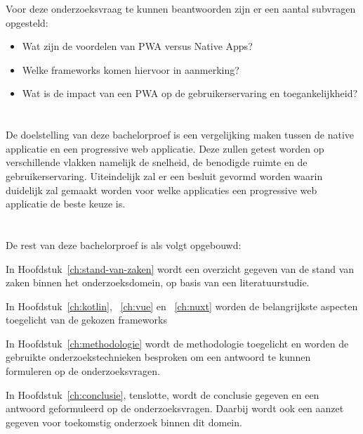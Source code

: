 Voor deze onderzoeksvraag te kunnen beantwoorden zijn er een aantal subvragen opgesteld:
\begin{itemize}
	\item Wat zijn de voordelen van PWA versus Native Apps?
	\item Welke frameworks komen hiervoor in aanmerking?
	\item  Wat is de impact van een PWA op de gebruikerservaring en toegankelijkheid?
\end{itemize}

\section{}
\label{sec:onderzoeksdoelstelling}

De doelstelling van deze bachelorproef is een vergelijking maken tussen de native applicatie en een progressive web applicatie. Deze zullen getest worden op verschillende vlakken namelijk de snelheid, de benodigde ruimte en de gebruikerservaring. Uiteindelijk zal er een besluit gevormd worden waarin duidelijk zal gemaakt worden voor welke applicaties een progressive web applicatie de beste keuze is.

\section{}
\label{sec:opzet-bachelorproef}


De rest van deze bachelorproef is als volgt opgebouwd:

In Hoofdstuk~\ref{ch:stand-van-zaken} wordt een overzicht gegeven van de stand van zaken binnen het onderzoeksdomein, op basis van een literatuurstudie.

In Hoofdstuk~\ref{ch:kotlin}, ~\ref{ch:vue} en ~\ref{ch:nuxt} worden de belangrijkste aspecten toegelicht van de gekozen frameworks

In Hoofdstuk~\ref{ch:methodologie} wordt de methodologie toegelicht en worden de gebruikte onderzoekstechnieken besproken om een antwoord te kunnen formuleren op de onderzoeksvragen.

In Hoofdstuk~\ref{ch:conclusie}, tenslotte, wordt de conclusie gegeven en een antwoord geformuleerd op de onderzoeksvragen. Daarbij wordt ook een aanzet gegeven voor toekomstig onderzoek binnen dit domein.